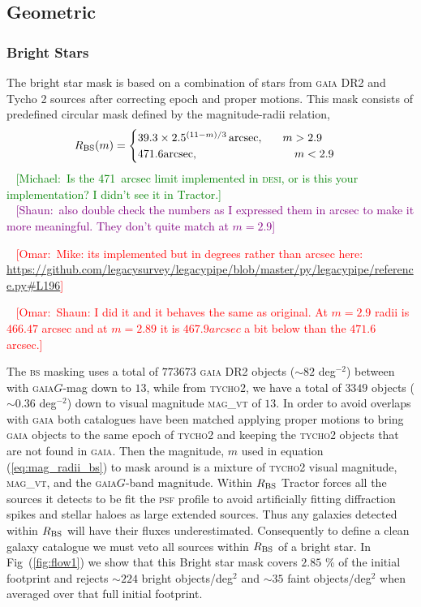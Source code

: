 \documentclass[fleqn,usenatbib]{mnras}
\newcommand{\mike}[1]{~\newline\noindent \textcolor{Green}{{ [Michael:~{#1}]\\}}}
\newcommand{\shaun}[1]{~\newline\noindent \textcolor{Purple}{{ [Shaun:~{#1}]\\}}}
\newcommand{\omar}[1]{~\newline\noindent \textcolor{red}{{ [Omar:~{#1}]\\}}}
\newcommand{\BS}{\textsc{bs}\xspace}
\newcommand{\DESI}{\textsc{desi}\xspace}
\newcommand{\GAIA}{\textsc{gaia}\xspace}
\newcommand{\PSF}{\textsc{psf}\xspace}
\newcommand{\TRACTOR}{\textsc{T}ractor\xspace}
\newcommand{\Tycho}{\textsc{tycho2}\xspace}
\begin{document}
\subsection{Geometric}\label{subsec:geometric}
\subsubsection{Bright Stars}

The bright star mask is based on a combination of stars from \GAIA DR2 \citep{2018A&A...616A...1G} and Tycho 2 \citep{2000A&A...355L..27H} sources after correcting epoch and proper motions. This mask consists of predefined circular mask defined by the magnitude-radii relation,
\begin{equation}
\label{eq:mag_radii_bs}
  R_{\rm BS}(m) =
\begin{cases}
  39.3 \times 2.5^{(11 - m)/3}\, {\rm arcsec}, \hspace{0.6cm} m > 2.9 \\
   471.6 {\rm arcsec}, \hspace{3cm} m < 2.9
\end{cases}
\end{equation}
\mike{Is the 471~arcsec limit implemented in \DESI, or is this your implementation?  I didn't see it in \TRACTOR.}
\shaun{also double check the numbers as I expressed them in arcsec to make it more meaningful. They don't quite match at $m=2.9$}

\omar{Mike: its implemented but in degrees rather than arcsec here: \url{https://github.com/legacysurvey/legacypipe/blob/master/py/legacypipe/reference.py#L196}}

\omar{Shaun: I did it and it behaves the same as original. At $m=2.9$ radii is $466.47$ arcsec and at $m=2.89$ it is $467.9 arcsec$ a bit below than the $471.6$ arcsec.}

The \BS masking uses a total of $773673$ \GAIA DR2 objects ($\sim 82$ deg$^{-2}$) between with \GAIA $G$-mag down to $13$, while from \Tycho, we have a total of $3349$ objects ($\sim 0.36$ deg$^{-2}$) down to visual magnitude  \textsc{mag}\_\textsc{vt} of $13$. In order to avoid overlaps with \GAIA both catalogues have been matched applying proper motions to bring \GAIA objects to the same epoch of \Tycho and keeping the \Tycho objects that are not found in \GAIA. Then the magnitude, $m$ used in equation (\ref{eq:mag_radii_bs}) to mask around is a mixture of \Tycho visual magnitude, \textsc{mag}\_\textsc{vt}, and the \GAIA $G$-band magnitude. Within $R_{\rm BS}$ \TRACTOR forces all the sources it detects to be fit the \PSF profile to avoid artificially fitting diffraction spikes and stellar haloes as large extended sources. Thus any galaxies detected within $R_{\rm BS}$ will have their 
fluxes underestimated. Consequently to define a clean galaxy catalogue we must veto all sources within  $R_{\rm BS}$ of a bright star. In Fig~(\ref{fig:flow1}) we show that this Bright star mask covers $2.85$ \% of the initial footprint and rejects $\sim 224$ bright objects/deg$^{2}$ and $\sim 35$ faint objects/deg$^{2}$ when averaged over that full initial footprint.
\end{document}
